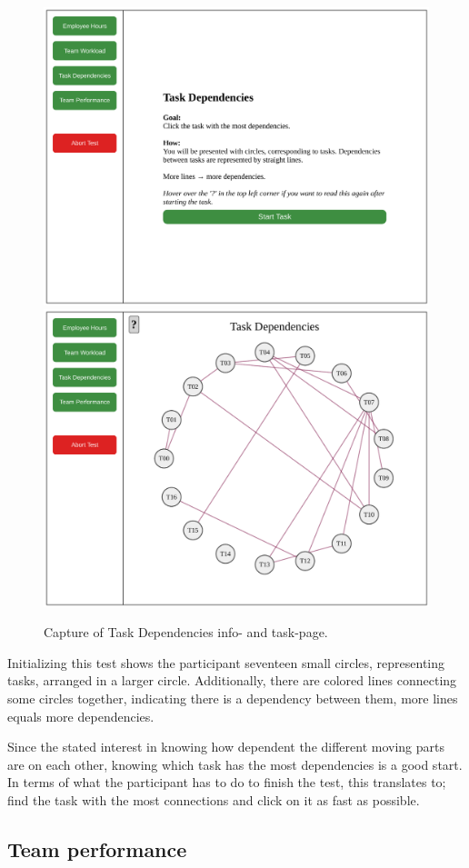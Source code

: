 \documentclass[nofilelist,dvipsnames]{cslthse-msc}
\begin{document}
{        \begin{figure}[h!]
          \centering
          \includegraphics[width=.49\textwidth]{figures/captures/webapp_dependencies_info.pdf}
          \includegraphics[width=.49\textwidth]{figures/captures/webapp_dependencies_task.pdf}
          \caption{Capture of Task Dependencies info- and task-page.}
        \end{figure}

        Initializing this test shows the participant seventeen small circles,
        representing tasks, arranged in a larger circle. Additionally, there are
        colored lines connecting some circles together, indicating there is
        a dependency between them, more lines equals more dependencies.

        Since the stated interest in knowing how dependent the different
        moving parts are on each other, knowing which task has the most
        dependencies is a good start. In terms of what the participant has to
        do to finish the test, this translates to; find the task with the most
        connections and click on it as fast as possible.

        \subsection{Team performance}

}
\end{document}
